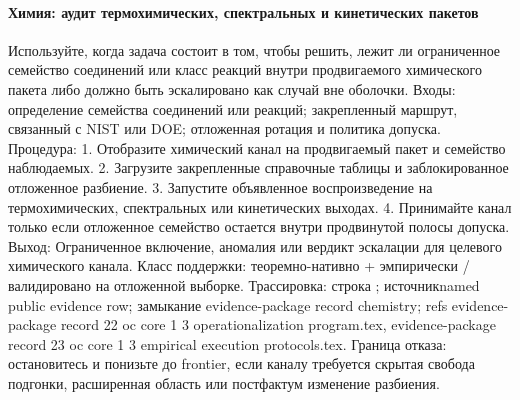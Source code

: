 \paragraph{Химия: аудит термохимических, спектральных и кинетических пакетов}
Используйте, когда задача состоит в том, чтобы решить, лежит ли ограниченное семейство соединений или класс реакций внутри продвигаемого химического пакета либо должно быть эскалировано как случай вне оболочки.
Входы: определение семейства соединений или реакций; \allowbreak закрепленный маршрут, связанный с NIST или DOE; \allowbreak отложенная ротация и политика допуска.
Процедура: 1. Отобразите химический канал на продвигаемый пакет и семейство наблюдаемых. 2. Загрузите закрепленные справочные таблицы и заблокированное отложенное разбиение. 3. Запустите объявленное воспроизведение на термохимических, спектральных или кинетических выходах. 4. Принимайте канал только если отложенное семейство остается внутри продвинутой полосы допуска.
Выход: Ограниченное включение, аномалия или вердикт эскалации для целевого химического канала.
Класс поддержки: теоремно-нативно + эмпирически / валидировано на отложенной выборке.
Трассировка: строка ; \allowbreak источникnamed public evidence row; \allowbreak замыкание evidence-package record chemistry; \allowbreak refs evidence-package record 22 oc core 1 3 operationalization program.tex, \allowbreak evidence-package record 23 oc core 1 3 empirical execution protocols.tex.
Граница отказа: остановитесь и понизьте до frontier, если каналу требуется скрытая свобода подгонки, расширенная область или постфактум изменение разбиения.

